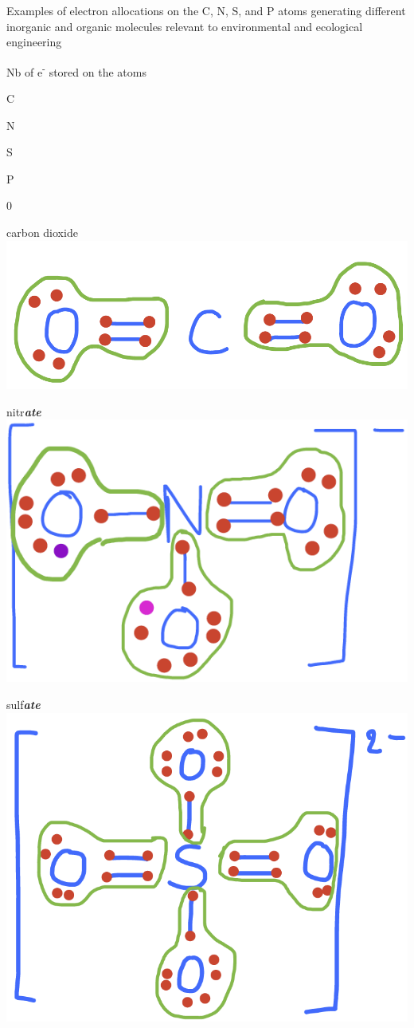 \documentclass[]{book}
\theoremstyle{definition}
\theoremstyle{definition}
\theoremstyle{definition}
\theoremstyle{remark}
\begin{document}
\label{tab:ElecAllocTab}Examples of electron allocations on the C, N, S, and
P atoms generating different inorganic and organic molecules relevant to
environmental and ecological engineering

Nb of e\textsuperscript{-} stored on the atoms

C

N

S

P

0

carbon dioxide~\includegraphics{pictures/ElecAlloc_CO2.png}

nitr\emph{\textbf{ate}}~\includegraphics{pictures/ElecAlloc_NO3-.png}

sulf\emph{\textbf{ate}}~\includegraphics{pictures/ElecAlloc_SO42-.png}
\end{document}
